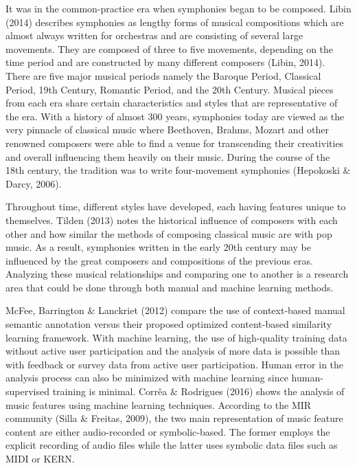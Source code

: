 	It was in the common-practice era when symphonies began to be composed. Libin (2014) describes symphonies as lengthy forms of musical compositions which are almost always written for orchestras and are consisting of several large movements. They are composed of three to five movements, depending on the time period and are constructed by many different composers (Libin, 2014). There are five major musical periods namely the Baroque Period, Classical Period, 19th Century, Romantic Period, and the 20th Century. Musical pieces from each era share certain characteristics and styles that are representative of the era. With a history of almost 300 years, symphonies today are viewed as the very pinnacle of classical music where Beethoven, Brahms, Mozart and other renowned composers were able to find a venue for transcending their creativities and overall influencing them heavily on their music. During the course of the 18th century, the tradition was  to write four-movement symphonies (Hepokoski \& Darcy, 2006). 

	Throughout time, different styles have developed, each having features unique to themselves. Tilden (2013) notes the historical influence of composers with each other and how similar the methods of composing classical music are with pop music.  As a result, symphonies written in the early 20th century may be influenced by the great composers and compositions of the previous eras. Analyzing these musical relationships and comparing one to another is a research area that could be done through both manual and machine learning methods.

	McFee, Barrington \& Lanckriet (2012) compare the use of context-based manual semantic annotation versus their proposed optimized content-based similarity learning framework. With machine learning, the use of high-quality training data without active user participation and the analysis of more data is possible than with feedback or survey data from active user participation. Human error in the analysis process can also be minimized with machine learning since human-supervised training is minimal. Corrêa \& Rodrigues (2016) shows the analysis of music features using machine learning techniques. According to the MIR community (Silla \& Freitas, 2009), the two main representation of music feature content are either audio-recorded or symbolic-based. The former employs the explicit recording of audio files while the latter uses symbolic data files such as MIDI or KERN.

